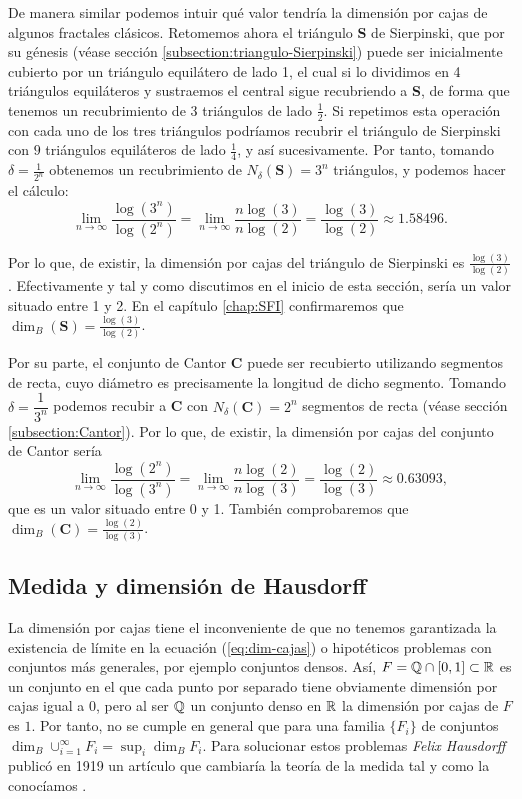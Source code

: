 De manera similar podemos intuir qué valor tendría la dimensión por cajas de algunos fractales clásicos. Retomemos ahora el triángulo \textbf{S} de Sierpinski, que por su génesis (véase sección \ref{subsection:triangulo-Sierpinski}) puede ser inicialmente cubierto por un triángulo equilátero de lado 1, el cual si lo dividimos en 4 triángulos equiláteros y sustraemos el central sigue recubriendo a \textbf{S}, de forma que tenemos un recubrimiento de 3 triángulos de lado $\frac{1}{2}$. Si repetimos esta operación con cada uno de los tres triángulos podríamos recubrir el triángulo de Sierpinski con $9$ triángulos equiláteros de lado $\frac 1 4$, y así sucesivamente. Por tanto, tomando $\delta=\frac{1}{2^n}$ obtenemos un recubrimiento de $N_\delta(\mathbf{S})=3^n$ triángulos, y podemos hacer el cálculo:
$$
\lim_{n\rightarrow\infty}\dfrac{\log(3^{n})}{\log(2^n)} = \lim_{n\rightarrow\infty}\dfrac{n\log(3)}{n\log(2)}=\dfrac{\log(3)}{\log(2)}\approx 1.58496.
$$

Por lo que, de existir, la dimensión por cajas del triángulo de Sierpinski es $\frac{\log(3)}{\log(2)}$. Efectivamente y tal y como discutimos en el inicio de esta sección, sería un valor situado entre 1 y 2. En el capítulo \ref{chap:SFI} confirmaremos que $\dim_B(\mathbf{S})=\frac{\log(3)}{\log(2)}$. 

Por su parte, el conjunto de Cantor \textbf{C} puede ser recubierto utilizando segmentos de recta, cuyo diámetro es precisamente la longitud de dicho segmento. Tomando $\delta=\dfrac{1}{3^n}$ podemos recubir a \textbf{C} con $N_\delta(\mathbf{C})=2^n$ segmentos de recta (véase sección \ref{subsection:Cantor}). Por lo que, de existir, la dimensión por cajas del conjunto de Cantor sería
$$
\lim_{n\rightarrow\infty}\dfrac{\log(2^{n})}{\log(3^n)} =\lim_{n\rightarrow\infty} \dfrac{n\log(2)}{n\log(3)}=\dfrac{\log(2)}{\log(3)}\approx 0.63093,
$$
que es un valor situado entre 0 y 1. También comprobaremos que $\dim_B(\mathbf{C})=\frac{\log(2)}{\log(3)}$.

\subsection{Medida y dimensión de Hausdorff}
\label{subsection:dim-Hausdorff}

La dimensión por cajas tiene el inconveniente de que no tenemos garantizada la existencia de límite en la ecuación (\ref{eq:dim-cajas}) o hipotéticos problemas con conjuntos más generales, por ejemplo conjuntos densos. Así, $F=\mathbb{Q}\cap[0,1]\subset\mathbb{R}$ es un conjunto en el que cada punto por separado tiene obviamente dimensión por cajas igual a 0, pero al ser $\mathbb{Q}$ un conjunto denso en $\mathbb{R}$ la dimensión por cajas de $F$ es $1$. Por tanto, no se cumple en general que para una familia $\{F_i\}$ de conjuntos $\dim_B\cup_{i=1}^\infty F_i = \sup_i\dim_B F_i$. Para solucionar estos problemas \textit{Felix Hausdorff} publicó en 1919 un artículo que cambiaría la teoría de la medida tal y como la conocíamos \cite{Hausdorff1919}. 



